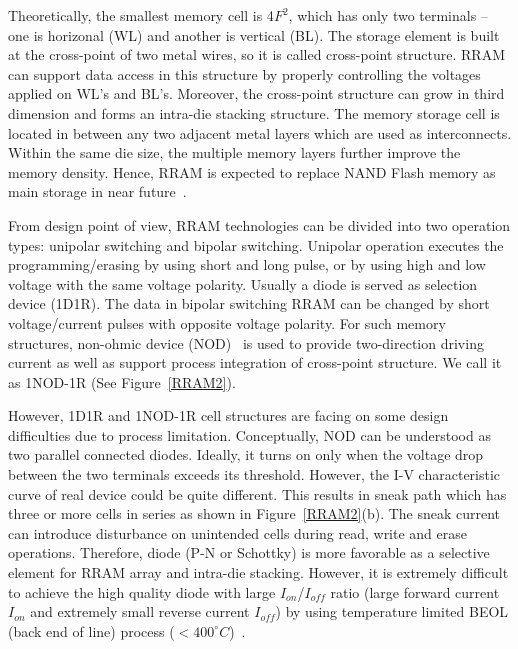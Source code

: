 Theoretically, the smallest memory cell is 4$F^2$, which has only two terminals -- one is horizonal (WL) and another is vertical (BL). The storage element is built at the cross-point of two metal wires, so it is called cross-point structure. RRAM can support data access in this structure by properly controlling the voltages applied on WL's and BL's. Moreover, the cross-point structure can grow in third dimension and forms an intra-die stacking structure. The memory storage cell is located in between any two adjacent metal layers which are used as interconnects. Within the same die size, the multiple memory layers further improve the memory density. Hence, RRAM is expected to replace NAND Flash memory as main storage in near future~\cite{ITRS07}.

From design point of view, RRAM technologies can be divided into two operation types: unipolar switching and bipolar switching. Unipolar operation executes the programming/erasing by using short and long pulse, or by using high and low voltage with the same voltage polarity. Usually a diode is served as selection device (1D1R). The data in bipolar switching RRAM can be changed by short voltage/current pulses with opposite voltage polarity. For such memory structures, non-ohmic device (NOD)~\cite{Yan4430255} is used to provide two-direction driving current as well as support process integration of cross-point structure. We call it as 1NOD-1R (See Figure~\ref{RRAM2}).

However, 1D1R and 1NOD-1R cell structures are facing on some design difficulties due to process limitation. Conceptually, NOD can be understood as two parallel connected diodes. Ideally, it turns on only when the voltage drop between the two terminals exceeds its threshold. However, the I-V characteristic curve of real device could be quite different.
This results in sneak path which has three or more cells in series as shown in Figure~\ref{RRAM2}(b). The sneak current can introduce disturbance on unintended cells during read, write and erase operations. Therefore, diode (P-N or Schottky) is more favorable as a selective element for RRAM array and intra-die stacking. However, it is extremely difficult to achieve the high quality diode with large $I_{on}$/$I_{off}$ ratio (large forward current $I_{on}$ and extremely small reverse current $I_{off}$) by using temperature limited BEOL (back end of line) process ($<400 ^{\circ}C$)~\cite{Sun:147791}.



